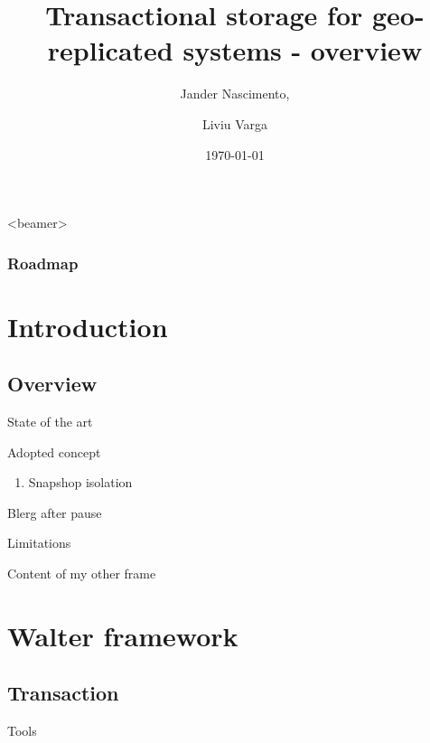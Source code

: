 \documentclass{beamer}
\title[Transactional storage for geo-replicated systems ]{Transactional storage for geo-replicated systems - overview}
\author{Jander Nascimento,
\and Liviu Varga}
\institute{Université Joseph Fourier}
\date{\today}
\begin{document}
\begin{frame}
\titlepage
\end{frame}

{
  \begin{frame}<beamer>
    \frametitle{Roadmap}
    \tableofcontents%
  \end{frame}
}


\section{Introduction}

	\subsection{Overview}
	
		\begin{frame}{State of the art}
		
		
		\end{frame}	
	
		\begin{frame}{Adopted concept}

			\begin{enumerate}
			\item Snapshop isolation
			\end{enumerate}
			
			\pause			
			Blerg after pause
		
			
		\end{frame}

		\begin{frame}{Limitations}

			Content of my other frame	
			
		\end{frame}
		

\section{Walter framework}

	\subsection{Transaction}
		\begin{frame}{Tools}
		
		
		

		\end{frame}
		
\end{document}
